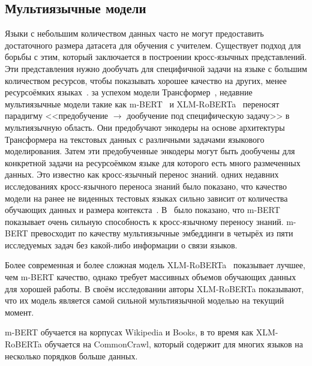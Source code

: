 \subsection{Мультиязычные модели}
Языки с небольшим количеством данных часто не могут предоставить достаточного размера датасета для обучения с учителем.
Существует подход для борьбы с этим, который заключается в построении кросс-язычных представлений.
Эти представления нужно дообучать для специфичной задачи на языке с большим количеством ресурсов, чтобы показывать хорошее качество на других, менее ресурсоёмких языках~\cite{klementiev-etal-2012-inducing}.
 за успехом модели Трансформер~\cite{Vaswani2017AttentionIA},
недавние мультиязычные модели такие как m-BERT~\cite{devlin-etal-2019-bert} и XLM-RoBERTa~\cite{Conneau2020UnsupervisedCR}
переносят парадигму <<предобучение $\rightarrow$ дообучение под специфическую задачу>> в мультиязычную область.
Они предобучают энкодеры на основе архитектуры Трансформера на текстовых данных с различными задачами языкового моделирования.
Затем эти предобученные энкодеры могут быть дообучены для конкретной задачи на ресурсоёмком языке для которого есть много размеченных данных.
Это известно как кросс-язычный перенос знаний.
 одних недавних исследованиях кросс-язычного переноса знаний было показано, что качество модели на ранее не виденных тестовых языках сильно зависит от количества обучающих данных и размера контекста~\cite{Liu2020WhatMM}.
В~\cite{Wu2019BetoBB} было показано, что m-BERT показывает очень сильную способность к кросс-язычному переносу знаний.
m-BERT превосходит по качеству мультиязычные эмбеддинги в четырёх из пяти исследуемых задач без какой-либо информации о связи языков.
\par Более современная и более сложная модель XLM-RoBERTa~\cite{Conneau2020UnsupervisedCR} показывает лучшее, чем m-BERT качество, однако требует массивных объемов обучающих данных для хорошей работы.
В своём исследовании авторы XLM-RoBERTa показывают, что их модель является самой сильной мультиязычной моделью на текущий момент.
\par m-BERT обучается на корпусах Wikipedia и Books, в то время как XLM-RoBERTa обучается на CommonCrawl, который содержит для многих языков на несколько порядков больше данных.

